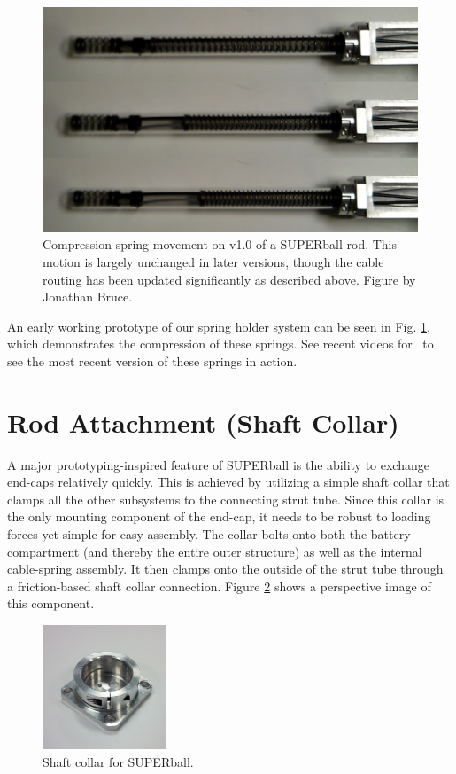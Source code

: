 \documentclass[12pt]{report}
\begin{document}
\begin{figure}[thpb]
      \centering
      \includegraphics[width=.5\columnwidth]{img/double_spring_series_6-9-14.jpg}
      \caption{Compression spring movement on v1.0 of a SUPERball rod. This motion is largely unchanged in later versions, though the cable routing has been updated significantly as described above. Figure by Jonathan Bruce.~\cite{bruce2014design}}
      \label{fig:spring_series}
      \vspace{-0.2cm}
\end{figure}

An early working prototype of our spring holder system can be seen in Fig. \ref{fig:spring_series}, which demonstrates the compression of these springs.
See recent videos for~\cite{sabelhaus2015system} to see the most recent version of these springs in action.

\section{Rod Attachment (Shaft Collar)}

A major prototyping-inspired feature of SUPERball is the ability to exchange end-caps relatively quickly.
This is achieved by utilizing a simple shaft collar that clamps all the other subsystems to the connecting strut tube.
Since this collar is the only mounting component of the end-cap, it needs to be robust to loading forces yet simple for easy assembly.
The collar bolts onto both the battery compartment (and thereby the entire outer structure) as well as the internal cable-spring assembly.
It then clamps onto the outside of the strut tube through a friction-based shaft collar connection.
Figure \ref{fig:redesigned_shaft_collar} shows a perspective image of this component.

\begin{figure}
  \vspace{-0.7cm}
  \begin{center}
    \includegraphics[width=0.33\textwidth]{img/redesigned_shaft_collar}
    \caption{Shaft collar for SUPERball.~\cite{sabelhaus2014hardware}}
    \label{fig:redesigned_shaft_collar}
  \end{center}
  \vspace{-1.0cm}
\end{figure}
\end{document}
